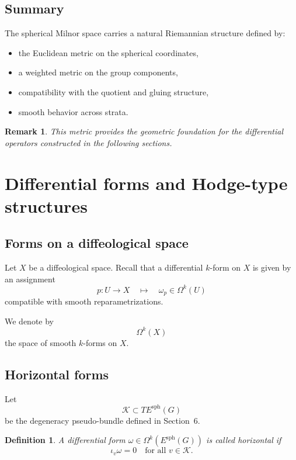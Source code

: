\documentclass[11pt]{amsart}
\newtheorem{definition}[theorem]{Definition}
\newtheorem{remark}[theorem]{Remark}
\begin{document}
\subsection{Summary}

The spherical Milnor space carries a natural Riemannian structure defined by:
\begin{itemize}
\item the Euclidean metric on the spherical coordinates,
\item a weighted metric on the group components,
\item compatibility with the quotient and gluing structure,
\item smooth behavior across strata.
\end{itemize}

\begin{remark}
This metric provides the geometric foundation for the differential operators constructed in the following sections.
\end{remark}
\section{Differential forms and Hodge-type structures} \label{7}

\subsection{Forms on a diffeological space}

Let $X$ be a diffeological space. Recall that a differential $k$-form on $X$ is given by an assignment
\[
p : U \to X \quad \longmapsto \quad \omega_p \in \Omega^k(U)
\]
compatible with smooth reparametrizations.

We denote by
\[
\Omega^k(X)
\]
the space of smooth $k$-forms on $X$.

\subsection{Horizontal forms}

Let
\[
\mathcal K \subset TE^{\mathrm{sph}}(G)
\]
be the degeneracy pseudo-bundle defined in Section~6.

\begin{definition}
A differential form $\omega \in \Omega^k(E^{\mathrm{sph}}(G))$ is called \emph{horizontal} if
\[
\iota_v \omega = 0
\quad \text{for all } v \in \mathcal K.
\]
\end{definition}
\end{document}
